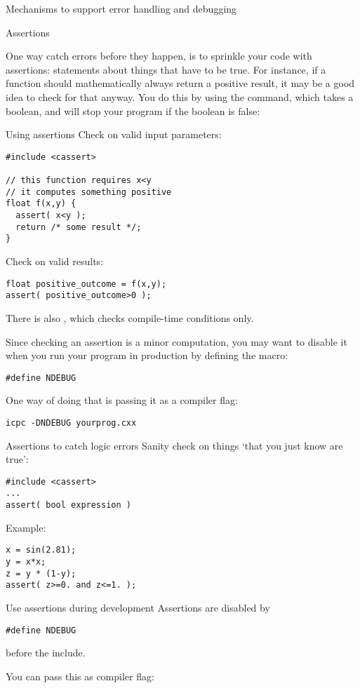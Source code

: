  {Mechanisms to support error handling and debugging}

 {Assertions}

One way catch errors before they happen, is to sprinkle your code with
assertions: statements about things that have to be true. For
instance, if a function should mathematically always return a positive
result, it may be a good idea to check for that anyway. You do this by
using the  command, which takes a boolean, and
will stop your program if the boolean is false:

\begin{block}{Using assertions}
 \label{sl:use-assert}
 Check on valid input parameters:
\begin{lstlisting}
#include <cassert>

// this function requires x<y
// it computes something positive
float f(x,y) {
  assert( x<y );
  return /* some result */;
}
\end{lstlisting}
Check on valid results:
\begin{lstlisting}
float positive_outcome = f(x,y);
assert( positive_outcome>0 );
\end{lstlisting}
\end{block}

There is also , which
checks compile-time conditions only.

Since checking an assertion is a minor computation, you may want to
disable it when you run your program in production by defining the
 macro:
\begin{lstlisting}
#define NDEBUG
\end{lstlisting}
One way of doing that is passing it as a compiler flag:
\begin{verbatim}
icpc -DNDEBUG yourprog.cxx
\end{verbatim}

\begin{slide}{Assertions to catch logic errors}
  \label{sl:cpp-assert1}
  Sanity check on things `that you just know are true':
\begin{lstlisting}
#include <cassert>
...
assert( bool expression )
\end{lstlisting}
Example:
\begin{lstlisting}
x = sin(2.81);
y = x*x;
z = y * (1-y);
assert( z>=0. and z<=1. );
\end{lstlisting}
\end{slide}

\begin{slide}{Use assertions during development}
  \label{sl:cpp-assert2}
Assertions are disabled by
\begin{lstlisting}
#define NDEBUG
\end{lstlisting}
before the include.

You can pass this as compiler flag:\\
\end{slide}

